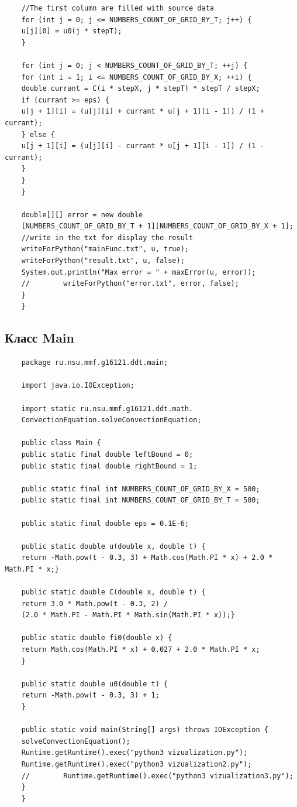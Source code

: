 \documentclass[12pt,a4paper]{scrartcl}
\begin{document}
\begin{verbatim}
	//The first column are filled with source data
	for (int j = 0; j <= NUMBERS_COUNT_OF_GRID_BY_T; j++) {
	u[j][0] = u0(j * stepT);
	}
	
	for (int j = 0; j < NUMBERS_COUNT_OF_GRID_BY_T; ++j) {
	for (int i = 1; i <= NUMBERS_COUNT_OF_GRID_BY_X; ++i) {
	double currant = C(i * stepX, j * stepT) * stepT / stepX;
	if (currant >= eps) {
	u[j + 1][i] = (u[j][i] + currant * u[j + 1][i - 1]) / (1 + currant);
	} else {
	u[j + 1][i] = (u[j][i] - currant * u[j + 1][i - 1]) / (1 - currant);
	}
	}
	}
	
	double[][] error = new double
	[NUMBERS_COUNT_OF_GRID_BY_T + 1][NUMBERS_COUNT_OF_GRID_BY_X + 1];
	//write in the txt for display the result
	writeForPython("mainFunc.txt", u, true);
	writeForPython("result.txt", u, false);
	System.out.println("Max error = " + maxError(u, error));
	//        writeForPython("error.txt", error, false);
	}
	}
	\end{verbatim}
	\subsection{Класс Main}
	\begin{verbatim}
	package ru.nsu.mmf.g16121.ddt.main;
	
	import java.io.IOException;
	
	import static ru.nsu.mmf.g16121.ddt.math.
	ConvectionEquation.solveConvectionEquation;
	
	public class Main {
	public static final double leftBound = 0;
	public static final double rightBound = 1;
	
	public static final int NUMBERS_COUNT_OF_GRID_BY_X = 500;
	public static final int NUMBERS_COUNT_OF_GRID_BY_T = 500;
	
	public static final double eps = 0.1E-6;
	
	public static double u(double x, double t) {
	return -Math.pow(t - 0.3, 3) + Math.cos(Math.PI * x) + 2.0 * Math.PI * x;}
	
	public static double C(double x, double t) {
	return 3.0 * Math.pow(t - 0.3, 2) /
	(2.0 * Math.PI - Math.PI * Math.sin(Math.PI * x));}
	
	public static double fi0(double x) {
	return Math.cos(Math.PI * x) + 0.027 + 2.0 * Math.PI * x;
	}
	
	public static double u0(double t) {
	return -Math.pow(t - 0.3, 3) + 1;
	}
	
	public static void main(String[] args) throws IOException {
	solveConvectionEquation();
	Runtime.getRuntime().exec("python3 vizualization.py");
	Runtime.getRuntime().exec("python3 vizualization2.py");
	//        Runtime.getRuntime().exec("python3 vizualization3.py");
	}
	}
	\end{verbatim}
\end{document}

